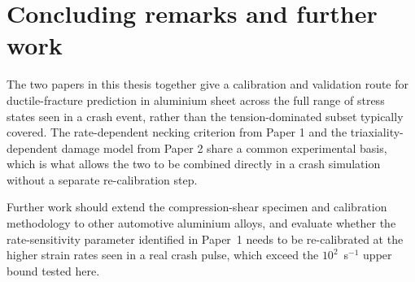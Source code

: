 \chapter{Concluding remarks and further work}
\label{Ch:ConcludingRemarksFurtherWork}

The two papers in this thesis together give a calibration and validation
route for ductile-fracture prediction in aluminium sheet across the full
range of stress states seen in a crash event, rather than the
tension-dominated subset typically covered. The rate-dependent necking
criterion from Paper 1 and the triaxiality-dependent damage model from
Paper 2 share a common experimental basis, which is what allows the two to
be combined directly in a crash simulation without a separate
re-calibration step.

Further work should extend the compression-shear specimen and calibration
methodology to other automotive aluminium alloys, and evaluate whether the
rate-sensitivity parameter identified in Paper~1 needs to be re-calibrated
at the higher strain rates seen in a real crash pulse, which exceed the
$10^{2}$~s$^{-1}$ upper bound tested here.
